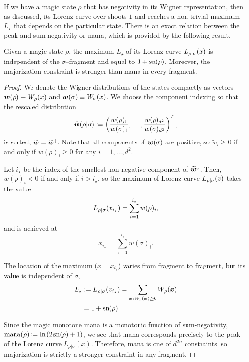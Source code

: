 \documentclass[pra,
aps,
twocolumn,
superscriptaddress,
groupedaddress,
nofootinbib,
reprint
]{revtex4-1}
\begin{document}
If we have a magic state $\rho$ that has negativity in its Wigner representation, then as discussed, its Lorenz curve over-shoots $1$ and reaches a non-trivial maximum $L_\star$ that depends on the particular state. There is an exact relation between the peak and sum-negativity or mana, which is provided by the following result.
\begin{lemma}\label{lem:lcmax}
	Given a magic state $\rho$, the maximum $L_\star$ of its Lorenz curve ${L_{\rho|\sigma}}(x)$ is independent of the $\sigma$--fragment and equal to $1+{{\rm{sn}}(\rho)}$. Moreover, the majorization constraint is stronger than mana in every fragment.
\end{lemma}
\begin{proof}
	We denote the Wigner distributions of the states compactly as vectors $\bm{w}(\rho) \equiv W_\rho(x)$ and $\bm{w}(\sigma) \equiv W_\sigma(x)$.
	We choose the component indexing so that the rescaled distribution 
	\begin{equation}
		\widetilde{\bm{w}}(\rho|\sigma) \coloneqq \left(\frac{w(\rho)_1}{w(\sigma)_1}, \dots, \frac{w(\rho)_{d^2}}{w(\sigma)_{d^2}} \right)^T,
	\end{equation}
	is sorted, $\widetilde{\bm{w}} = \widetilde{\bm{w}}^\downarrow$.
	Note that all components of $\bm{w}(\sigma)$ are positive, so $\widetilde{w}_i \geq 0$ if and only if $w(\rho)_i \geq 0$ for any $i=1,\dots,d^2$.
	
	Let $i_\star$ be the index of the smallest non-negative component of $\widetilde{\bm{w}}^\downarrow$.
	Then, $w(\rho)_i < 0$ if and only if $i > i_\star$, so the maximum of Lorenz curve ${L_{\rho|\sigma}}(x)$ takes the value 
	\begin{equation}
		{L_{\rho|\sigma}}(x_{i_\star}) = \sum_{i=1}^{i_\star} w(\rho)_i,
	\end{equation}
	and is achieved at
	\begin{equation}\label{eq:maxloc}
		x_{i_\star} \coloneqq \sum_{i=1}^{i_\star} w(\sigma)_i.
	\end{equation}

	The location of the maximum ($x=x_{i_\star}$) varies from fragment to fragment, but its value is independent of $\sigma$,
	\begin{align}
	L_\star &:=	\lc{\rho}{\sigma}(x_{i_\star}) 
		= \sum\limits_{\bmx: \W[\bmx]{\rho} \geq 0} \W[\bmx]{\rho} \nonumber \\
		&= 1 + \sn{\rho}.
	\end{align}
	
Since the magic monotone mana is a monotonic function of sum-negativity, $\rm{mana}(\rho) \coloneqq \ln{(2\hspace{1pt} {{\rm{sn}}(\rho)} +1)}$, we see that mana corresponds precisely to the peak of the Lorenz curve $L_{\rho|\sigma}(x)$. Therefore, mana is one of $d^{2n}$ constraints, so majorization is strictly a stronger constraint in any fragment.
\end{proof}
\end{document}
